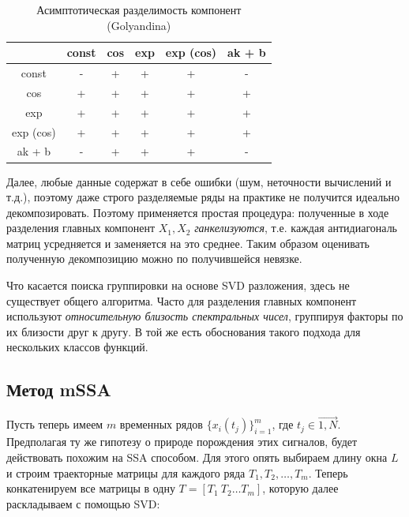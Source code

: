 	    	\begin{table}[h]
	    		\centering
	    		\caption{Асимптотическая разделимость компонент (Golyandina)}\label{tab:asympt_devis}
	    		\begin{tabular}{|c|c|c|c|c|c|}
	    			\hline
	    			& const & cos & exp & exp (cos) & ak + b \\ \hline
	    			const     & -     & +   & +   & +         & -      \\ \hline
	    			cos       & +     & +   & +   & +         & +      \\ \hline
	    			exp       & +     & +   & +   & +         & +      \\ \hline
	    			exp (cos) & +     & +   & +   & +         & +      \\ \hline
	    			ak + b    & -     & +   & +   & +         & -      \\ \hline
	    		\end{tabular}
	    	\end{table}
	    	
	    	Далее, любые данные содержат в себе ошибки (шум, неточности вычислений и т.д.), поэтому даже строго разделяемые ряды на практике не получится идеально декомпозировать. Поэтому применяется простая процедура: полученные в ходе разделения главных компонент $ X_1, X_2 $ \textit{ганкелизуются}, т.е. каждая антидиагональ матриц усредняется и заменяется на это среднее. Таким образом оценивать полученную декомпозицию можно по получившейся невязке.
	    	
	    	Что касается поиска группировки на основе SVD разложения, здесь не существует общего алгоритма. Часто для разделения главных компонент используют \textit{относительную близость спектральных чисел}, группируя факторы по их близости друг к другу. В той же \cite{ecfb9dc578be43ae9ee8fc88b8ff9151} есть  обоснования такого подхода для нескольких классов функций.	    	
	    	
	    	
			\subsection*{Метод mSSA}
			
			Пусть теперь имеем $ m $ временных рядов $ \{x_i(t_j)\}_{i = 1}^{m} $, где $ t_j \in \overrightarrow{1, N} $. Предполагая ту же гипотезу о природе порождения этих сигналов, будет действовать похожим на SSA способом. Для этого опять выбираем длину окна $ L $ и строим траекторные матрицы для каждого ряда $ T_1, T_2, \ldots , T_m  $. Теперь конкатенируем все матрицы в одну $ T = [T_1 \  T_2 \ldots T_m] $, которую далее раскладываем с помощью SVD:
			
